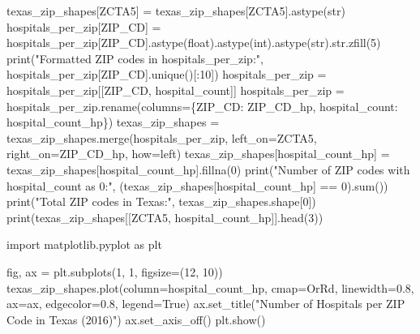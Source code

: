 \documentclass[
  letterpaper,
  DIV=11,
  numbers=noendperiod]{scrartcl}
\newenvironment{Shaded}{\begin{snugshade}}{\end{snugshade}}
\newcommand{\NormalTok}[1]{\textcolor[rgb]{0.00,0.23,0.31}{#1}}
\begin{document}
\begin{Shaded}
\begin{Highlighting}[]
\NormalTok{texas\_zip\_shapes[\textquotesingle{}ZCTA5\textquotesingle{}] = texas\_zip\_shapes[\textquotesingle{}ZCTA5\textquotesingle{}].astype(str)}
\NormalTok{hospitals\_per\_zip[\textquotesingle{}ZIP\_CD\textquotesingle{}] = hospitals\_per\_zip[\textquotesingle{}ZIP\_CD\textquotesingle{}].astype(float).astype(int).astype(str).str.zfill(5)}
\NormalTok{print("Formatted ZIP codes in hospitals\_per\_zip:", hospitals\_per\_zip[\textquotesingle{}ZIP\_CD\textquotesingle{}].unique()[:10])}
\NormalTok{hospitals\_per\_zip = hospitals\_per\_zip[[\textquotesingle{}ZIP\_CD\textquotesingle{}, \textquotesingle{}hospital\_count\textquotesingle{}]]}
\NormalTok{hospitals\_per\_zip = hospitals\_per\_zip.rename(columns=\{\textquotesingle{}ZIP\_CD\textquotesingle{}: \textquotesingle{}ZIP\_CD\_hp\textquotesingle{}, \textquotesingle{}hospital\_count\textquotesingle{}: \textquotesingle{}hospital\_count\_hp\textquotesingle{}\})}
\NormalTok{texas\_zip\_shapes = texas\_zip\_shapes.merge(hospitals\_per\_zip, left\_on=\textquotesingle{}ZCTA5\textquotesingle{}, right\_on=\textquotesingle{}ZIP\_CD\_hp\textquotesingle{}, how=\textquotesingle{}left\textquotesingle{})}
\NormalTok{texas\_zip\_shapes[\textquotesingle{}hospital\_count\_hp\textquotesingle{}] = texas\_zip\_shapes[\textquotesingle{}hospital\_count\_hp\textquotesingle{}].fillna(0)}
\NormalTok{print("Number of ZIP codes with hospital\_count as 0:", (texas\_zip\_shapes[\textquotesingle{}hospital\_count\_hp\textquotesingle{}] == 0).sum())}
\NormalTok{print("Total ZIP codes in Texas:", texas\_zip\_shapes.shape[0])}
\NormalTok{print(texas\_zip\_shapes[[\textquotesingle{}ZCTA5\textquotesingle{}, \textquotesingle{}hospital\_count\_hp\textquotesingle{}]].head(3))}
\end{Highlighting}
\end{Shaded}

\begin{Shaded}
\begin{Highlighting}[]
\NormalTok{import matplotlib.pyplot as plt}

\NormalTok{fig, ax = plt.subplots(1, 1, figsize=(12, 10))}
\NormalTok{texas\_zip\_shapes.plot(column=\textquotesingle{}hospital\_count\_hp\textquotesingle{}, cmap=\textquotesingle{}OrRd\textquotesingle{}, linewidth=0.8, ax=ax, edgecolor=\textquotesingle{}0.8\textquotesingle{}, legend=True)}
\NormalTok{ax.set\_title("Number of Hospitals per ZIP Code in Texas (2016)")}
\NormalTok{ax.set\_axis\_off()}
\NormalTok{plt.show()}
\end{Highlighting}
\end{Shaded}
\end{document}
